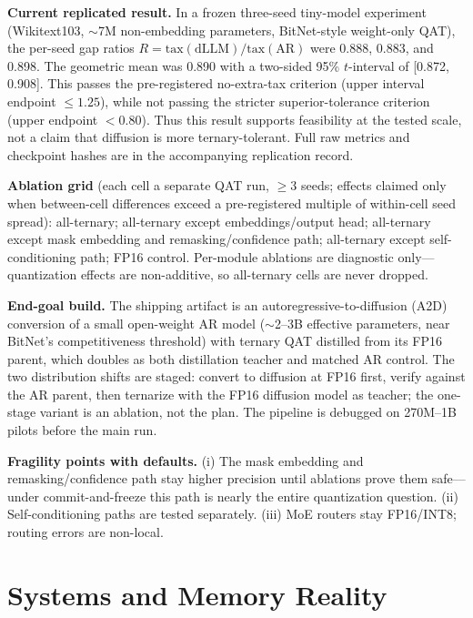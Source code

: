 \documentclass[11pt]{article}
\begin{document}
\textbf{Current replicated result.} In a frozen three-seed tiny-model experiment (Wikitext103, $\sim$7M non-embedding parameters, BitNet-style weight-only QAT), the per-seed gap ratios $R=\mathrm{tax}(\mathrm{dLLM})/\mathrm{tax}(\mathrm{AR})$ were 0.888, 0.883, and 0.898. The geometric mean was 0.890 with a two-sided 95\% $t$-interval of [0.872, 0.908]. This passes the pre-registered no-extra-tax criterion (upper interval endpoint $\leq1.25$), while not passing the stricter superior-tolerance criterion (upper endpoint $<0.80$). Thus this result supports feasibility at the tested scale, not a claim that diffusion is more ternary-tolerant. Full raw metrics and checkpoint hashes are in the accompanying replication record.

\textbf{Ablation grid} (each cell a separate QAT run, $\geq 3$ seeds; effects claimed only when between-cell differences exceed a pre-registered multiple of within-cell seed spread): all-ternary; all-ternary except embeddings/output head; all-ternary except mask embedding and remasking/confidence path; all-ternary except self-conditioning path; FP16 control. Per-module ablations are diagnostic only---quantization effects are non-additive, so all-ternary cells are never dropped.

\textbf{End-goal build.} The shipping artifact is an autoregressive-to-diffusion (A2D) conversion of a small open-weight AR model ($\sim$2--3B effective parameters, near BitNet's competitiveness threshold) with ternary QAT distilled from its FP16 parent, which doubles as both distillation teacher and matched AR control. The two distribution shifts are staged: convert to diffusion at FP16 first, verify against the AR parent, then ternarize with the FP16 diffusion model as teacher; the one-stage variant is an ablation, not the plan. The pipeline is debugged on 270M--1B pilots before the main run.

\textbf{Fragility points with defaults.} (i) The mask embedding and remasking/confidence path stay higher precision until ablations prove them safe---under commit-and-freeze this path is nearly the entire quantization question. (ii) Self-conditioning paths are tested separately. (iii) MoE routers stay FP16/INT8; routing errors are non-local.

\section{Systems and Memory Reality}
\label{sec:systems}
\end{document}
